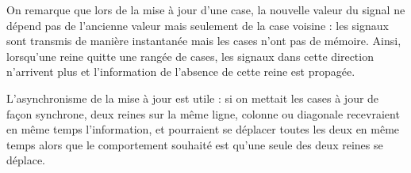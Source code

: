 \documentclass[11pt, openany]{article}
\begin{document}
On remarque que lors de la mise à jour d'une case, la nouvelle valeur du signal ne dépend pas de l'ancienne valeur mais seulement de la case voisine : les signaux sont transmis de manière instantanée mais les cases n'ont pas de mémoire. Ainsi, lorsqu'une reine quitte une rangée de cases, les signaux dans cette direction n'arrivent plus et l'information de l'absence de cette reine est propagée. 

L'asynchronisme de la mise à jour est utile : si on mettait les cases à jour de façon synchrone, deux reines sur la même ligne, colonne ou diagonale recevraient en même temps l'information, et pourraient se déplacer toutes les deux en même temps alors que le comportement souhaité est qu'une seule des deux reines se déplace. 


\end{document}
